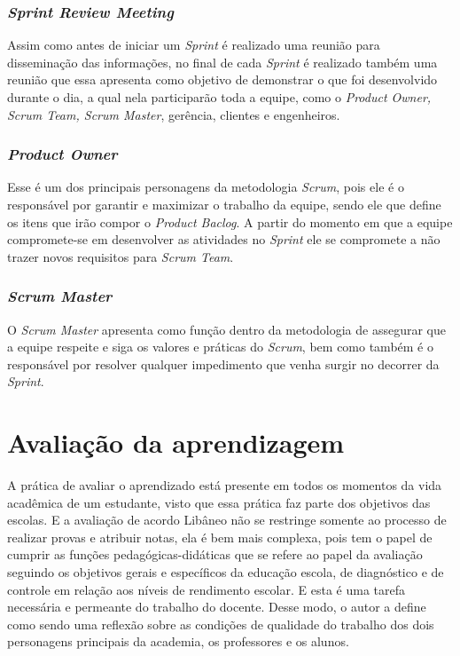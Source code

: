 {{\subsubsection{\textit{Sprint Review Meeting}}
\noindent Assim como antes de iniciar um \textit{Sprint} é realizado uma reunião para disseminação das informações, no final de cada \textit{Sprint} é realizado também uma reunião que essa apresenta como objetivo de demonstrar o que foi desenvolvido durante o dia, a qual nela participarão toda a equipe, como o \textit{Product Owner, Scrum Team, Scrum Master}, gerência, clientes e engenheiros.

\subsubsection{\textit{Product Owner}}
\noindent Esse é um dos principais personagens da metodologia \textit{Scrum}, pois ele é o responsável por garantir e maximizar o trabalho da equipe, sendo ele que define os itens que irão compor o \textit{Product Baclog}. A partir do momento em que a equipe compromete-se em desenvolver as atividades no \textit{Sprint} ele se compromete a não trazer novos requisitos para \textit{Scrum Team}.

\subsubsection{\textit{Scrum Master}}
\noindent O \textit{Scrum Master} apresenta como função dentro da metodologia de assegurar que a equipe respeite e siga os valores e práticas do \textit{Scrum}, bem como também é o responsável por resolver qualquer impedimento que venha surgir no decorrer da \textit{Sprint}.

\section{Avaliação da aprendizagem}
\noindent A prática de avaliar o aprendizado está presente em todos os momentos da vida acadêmica de um estudante, visto que essa prática faz parte dos objetivos das escolas. E a avaliação de acordo Libâneo \cite{1990:libaneo} não se restringe somente ao processo de realizar provas e atribuir notas, ela é bem mais complexa, pois tem o papel de cumprir as funções pedagógicas-didáticas que se refere ao papel da avaliação seguindo os objetivos gerais e específicos da educação escola, de diagnóstico e de controle em relação aos níveis de rendimento escolar. E esta é uma tarefa necessária e permeante do trabalho do docente. Desse modo, o autor a define como sendo uma reflexão sobre as condições de qualidade do trabalho dos dois personagens principais da academia, os professores e os alunos.

}}
